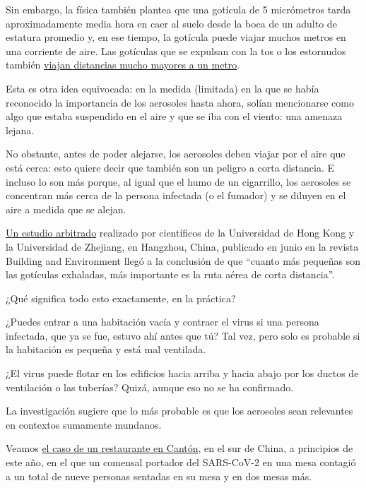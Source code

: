 Sin embargo, la física también plantea que una gotícula de 5 micrómetros
tarda aproximadamente media hora en caer al suelo desde la boca de un
adulto de estatura promedio y, en ese tiempo, la gotícula puede viajar
muchos metros en una corriente de aire. Las gotículas que se expulsan
con la tos o los estornudos también
\href{https://academic.oup.com/jid/advance-article/doi/10.1093/infdis/jiaa189/5820886}{viajan
distancias mucho mayores a un metro}.

Esta es otra idea equivocada: en la medida (limitada) en la que se había
reconocido la importancia de los aerosoles hasta ahora, solían
mencionarse como algo que estaba suspendido en el aire y que se iba con
el viento: una amenaza lejana.

No obstante, antes de poder alejarse, los aerosoles deben viajar por el
aire que está cerca: esto quiere decir que también son un peligro a
corta distancia. E incluso lo son más porque, al igual que el humo de un
cigarrillo, los aerosoles se concentran más cerca de la persona
infectada (o el fumador) y se diluyen en el aire a medida que se alejan.

\href{https://www.sciencedirect.com/science/article/abs/pii/S0360132320302183?via\%3Dihub}{Un
estudio arbitrado} realizado por científicos de la Universidad de Hong
Kong y la Universidad de Zhejiang, en Hangzhou, China, publicado en
junio en la revista Building and Environment llegó a la conclusión de
que ``cuanto más pequeñas son las gotículas exhaladas, más importante es
la ruta aérea de corta distancia''.

¿Qué significa todo esto exactamente, en la práctica?

¿Puedes entrar a una habitación vacía y contraer el virus si una persona
infectada, que ya se fue, estuvo ahí antes que tú? Tal vez, pero solo es
probable si la habitación es pequeña y está mal ventilada.

¿El virus puede flotar en los edificios hacia arriba y hacia abajo por
los ductos de ventilación o las tuberías? Quizá, aunque eso no se ha
confirmado.

La investigación sugiere que lo más probable es que los aerosoles sean
relevantes en contextos sumamente mundanos.

Veamos
\href{https://www.nytimes.com/2020/04/20/health/airflow-coronavirus-restaurants.html}{el
caso de un restaurante en Cantón}, en el sur de China, a principios de
este año, en el que un comensal portador del SARS-CoV-2 en una mesa
contagió a un total de nueve personas sentadas en su mesa y en dos mesas
más.


